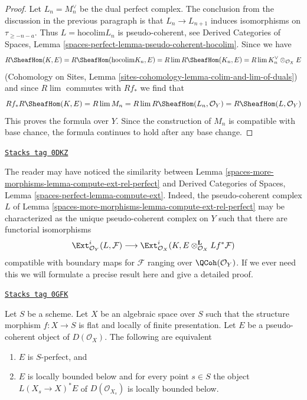 \begin{proof}
\medskip\noindent
Let $L_n = M_n^\vee$ be the dual perfect complex. The
conclusion from the discussion in the previous paragraph is that
$L_n \to L_{n + 1}$ induces isomorphisms on $\tau_{\geq -n - a}$.
Thus $L = \text{hocolim} L_n$ is pseudo-coherent, see
Derived Categories of Spaces, Lemma
\ref{spaces-perfect-lemma-pseudo-coherent-hocolim}.
Since we have
$$
R\SheafHom(K, E) = R\SheafHom(\text{hocolim} K_n, E) =
R\lim R\SheafHom(K_n, E) = R\lim K_n^\vee \otimes_{\mathcal{O}_X} E
$$
(Cohomology on Sites, Lemma
\ref{sites-cohomology-lemma-colim-and-lim-of-duals})
and since $R\lim$ commutes with $Rf_*$ we find that
$$
Rf_*R\SheafHom(K, E) = R\lim M_n = R\lim R\SheafHom(L_n, \mathcal{O}_Y) =
R\SheafHom(L, \mathcal{O}_Y)
$$
This proves the formula over $Y$. Since the construction of $M_n$ is
compatible with base chance, the formula continues to hold after
any base change.
\end{proof}

\begin{remark}[Compare L]
\label{spaces-more-morphisms-remark-compare-L}
\href{https://stacks.math.columbia.edu/tag/0DKZ}{\texttt{Stacks tag 0DKZ}}

The reader may have noticed the similarity between
Lemma \ref{spaces-more-morphisms-lemma-compute-ext-rel-perfect} and
Derived Categories of Spaces, Lemma \ref{spaces-perfect-lemma-compute-ext}.
Indeed, the pseudo-coherent complex $L$ of
Lemma \ref{spaces-more-morphisms-lemma-compute-ext-rel-perfect}
may be characterized as the unique pseudo-coherent complex
on $Y$ such that there are functorial isomorphisms
$$
\Ext^i_{\mathcal{O}_Y}(L, \mathcal{F}) \longrightarrow
\Ext^i_{\mathcal{O}_X}(K,
E \otimes_{\mathcal{O}_X}^\mathbf{L} Lf^*\mathcal{F})
$$
compatible with boundary maps for $\mathcal{F}$ ranging over
$\QCoh(\mathcal{O}_Y)$. If we ever need this we will
formulate a precise result here and give a detailed proof.
\end{remark}

\begin{lemma}
\label{spaces-more-morphisms-lemma-bounded-on-fibres}
\href{https://stacks.math.columbia.edu/tag/0GFK}{\texttt{Stacks tag 0GFK}}

Let $S$ be a scheme. Let $X$ be an algebraic space over $S$ such that
the structure morphism $f : X \to S$ is flat and
locally of finite presentation. Let $E$ be a pseudo-coherent
object of $D(\mathcal{O}_X)$. The following are equivalent
\begin{enumerate}
\item $E$ is $S$-perfect, and
\item $E$ is locally bounded below and for every point $s \in S$
the object $L(X_s \to X)^*E$ of $D(\mathcal{O}_{X_s})$
is locally bounded below.
\end{enumerate}
\end{lemma}

